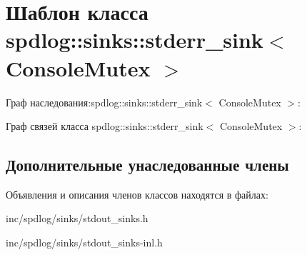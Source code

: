 \hypertarget{classspdlog_1_1sinks_1_1stderr__sink}{}\section{Шаблон класса spdlog\+:\+:sinks\+:\+:stderr\+\_\+sink$<$ Console\+Mutex $>$}
\label{classspdlog_1_1sinks_1_1stderr__sink}


Граф наследования\+:spdlog\+:\+:sinks\+:\+:stderr\+\_\+sink$<$ Console\+Mutex $>$\+:


Граф связей класса spdlog\+:\+:sinks\+:\+:stderr\+\_\+sink$<$ Console\+Mutex $>$\+:
\subsection*{Дополнительные унаследованные члены}


Объявления и описания членов классов находятся в файлах\+:\begin{DoxyCompactItemize}
\item 
inc/spdlog/sinks/stdout\+\_\+sinks.\+h\item 
inc/spdlog/sinks/stdout\+\_\+sinks-\/inl.\+h\end{DoxyCompactItemize}
